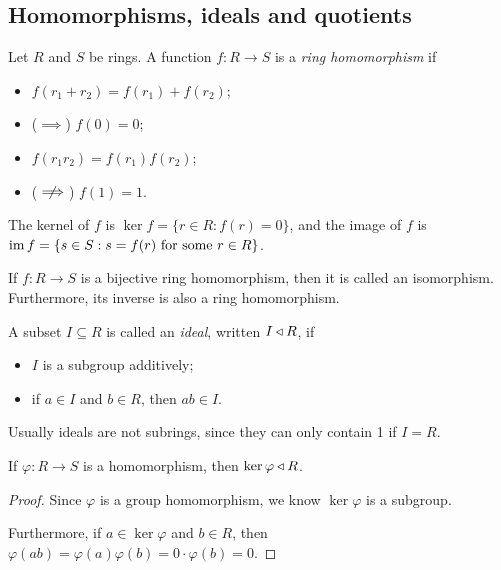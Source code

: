 \documentclass{../../template/note}
\begin{document}
    \subsection{Homomorphisms, ideals and quotients}

    \begin{definition}
        Let $R$ and $S$ be rings. A function $f: R \to S$ is a \emph{ring homomorphism} if
        \begin{itemize}
            \item $f(r_1 + r_2) = f(r_1) + f(r_2)$;
            \item ($\implies$) $f(0) = 0$;
            \item $f(r_1r_2) = f(r_1)f(r_2)$;
            \item ($\centernot\implies$) $f(1) = 1$.
        \end{itemize}
        The kernel of $f$ is $\ker f = \{r \in R : f(r) = 0\}$, and the image of $f$ is $\operatorname{im} f = \{s \in S: s = f(r) \text{ for some }r \in R\}$.
    \end{definition}
    
    \begin{definition}
        If $f: R \to S$ is a bijective ring homomorphism, then it is called an isomorphism. Furthermore, its inverse is also a ring homomorphism.
    \end{definition}
    
    \begin{definition}
        A subset $I \subseteq R$ is called an \emph{ideal}, written $I \triangleleft R$, if
        \begin{itemize}
            \item $I$ is a subgroup additively;
            \item if $a \in I$ and $b \in R$, then $ab \in I$.
        \end{itemize}
        Usually ideals are not subrings, since they can only contain 1 if $I = R$.        
    \end{definition}
    
    \begin{lemma}
        If $\varphi: R \to S$ is a homomorphism, then $\ker \varphi \triangleleft R$.
    \end{lemma}
    
    \begin{proof}
        Since $\varphi$ is a group homomorphism, we know $\ker \varphi$ is a subgroup.

        Furthermore, if $a \in \ker \varphi$ and $b \in R$, then $\varphi(ab) = \varphi(a)\varphi(b) = 0 \cdot \varphi(b) = 0$.
    \end{proof}
    
\end{document}
